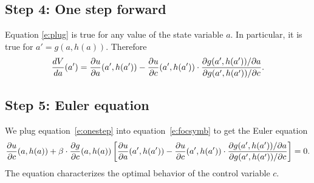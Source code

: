 \documentclass[letterpaper, 11pt, leqno]{article}
\begin{document}
\subsection{Step 4: One step forward}

Equation \eqref{e:plug} is true for any value of the state variable $a$. In particular, it is true for $a'=g(a,h(a))$. Therefore
\begin{equation}
\od{V}{a}(a')=\pd{u}{a}(a',h(a'))-\pd{u}{c}(a',h(a'))\cdot \frac{\pdx{g(a',h(a'))}{a}}{\pdx{g(a',h(a'))}{c}}.
\label{e:onestep}\end{equation}

\subsection{Step 5: Euler equation}

We plug equation~\eqref{e:onestep} into equation~\eqref{e:focsymb} to get the Euler equation
\begin{equation*}
\pd{u}{c}(a,h(a))+\b \cdot \pd{g}{c}(a,h(a)) \bs{\pd{u}{a}(a',h(a'))-\pd{u}{c}(a',h(a')) \cdot \frac{\pdx{g(a',h(a'))}{a}}{\pdx{g(a',h(a'))}{c}}}=0.
\end{equation*}
The equation characterizes the optimal behavior of the control variable $c$.
\end{document}
